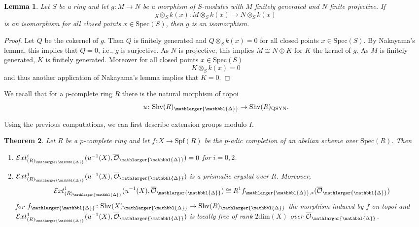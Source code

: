 \documentclass{amsart}
\newcommand{\prism}{{\mathlarger{\mathbbl{\Delta}}}}
\theoremstyle{plain}
\newtheorem{theorem}{Theorem}[subsection]
\newtheorem{lemma}[theorem]{Lemma}
\theoremstyle{definition}
\newcommand{\Spec}{\mathrm{Spec}}
\newcommand{\Spf}{\mathrm{Spf}}
\begin{document}
\begin{lemma}
  \label{sec:prism-cryst-abel-2-morphism-from-finitely-presented-module-to-finite-free-over-p-complete-ring-is-isomorphism}
  Let $S$ be a ring and let $g\colon M\to N$ be a morphism of $S$-modules with $M$ finitely generated and $N$ finite projective. If
  $$
  g\otimes_{S} k(x)\colon M\otimes_S k(x)\to N\otimes_S k(x)
  $$
  is an isomorphism for all closed points $x\in \Spec(S)$, then $g$ is an isomorphism.
\end{lemma}
\begin{proof}
  Let $Q$ be the cokernel of $g$. Then $Q$ is finitely generated and $Q\otimes_S k(x)=0$ for all closed points $x\in \Spec(S)$. By Nakayama's lemma, this implies that $Q=0$, i.e., $g$ is surjective. As $N$ is projective, this implies $M\cong N \oplus K$ for $K$ the kernel of $g$. As $M$ is finitely generated, $K$ is finitely generated. Moreover for all closed points $x\in \Spec(S)$
  $$
  K\otimes_{S} k(x)=0
  $$
  and thus another application of Nakayama's lemma implies that $K=0$.
\end{proof}

We recall that for a $p$-complete ring $R$ there is the natural morphism of topoi
$$
u\colon \mathrm{Shv}(R)_\prism\to \mathrm{Shv}(R)_{\mathrm{QSYN}}.
$$


Using the previous computations, we can first describe extension groups modulo $I$. 


\begin{theorem}
  \label{sec:prism-dieud-cryst-reduced-ext-for-abelian-schemes}
  Let $R$ be a $p$-complete ring and let $f\colon X\to \Spf(R)$ be the $p$-adic completion of an abelian scheme over $\Spec(R)$. Then
  \begin{enumerate}
   \item $\mathcal{E}xt_{(R)_{\prism}}^i(u^{-1}(X),\overline{\mathcal{O}}_\prism)=0$ for $i=0,2$.
   \item $\mathcal{E}xt_{(R)_{\prism}}^1(u^{-1}(X),\overline{\mathcal{O}}_\prism)$ is a prismatic crystal over $R$. Moreover,
     $$
     \mathcal{E}xt_{(R)_{\prism}}^1(u^{-1}(X),\overline{\mathcal{O}}_\prism)\cong R^1f_{\prism,\ast}(\overline{\mathcal{O}}_\prism)
     $$
     for $f_\prism\colon \mathrm{Shv}{(X)_\prism}\to \mathrm{Shv}{(R)_\prism}$ the morphism induced by $f$ on topoi and $\mathcal{E}xt_{(R)_{\prism}}^1(u^{-1}(X),\overline{\mathcal{O}}_\prism)$ is locally free of rank $2\mathrm{dim}(X)$ over $\overline{\mathcal{O}}_{\prism}$.
   \end{enumerate}
 \end{theorem}
\end{document}
